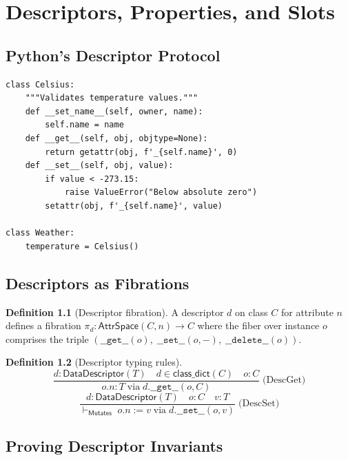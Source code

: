 \documentclass[11pt,a4paper]{report}
\theoremstyle{definition}
\newtheorem{definition}{Definition}[chapter]
\theoremstyle{plain}
\newcommand{\Mutates}{\mathsf{Mutates}}
\begin{document}
\chapter{Descriptors, Properties, and Slots}
\label{ch:descriptors}

\section{Python's Descriptor Protocol}

\begin{lstlisting}[style=python]
class Celsius:
    """Validates temperature values."""
    def __set_name__(self, owner, name):
        self.name = name
    def __get__(self, obj, objtype=None):
        return getattr(obj, f'_{self.name}', 0)
    def __set__(self, obj, value):
        if value < -273.15:
            raise ValueError("Below absolute zero")
        setattr(obj, f'_{self.name}', value)

class Weather:
    temperature = Celsius()
\end{lstlisting}

\section{Descriptors as Fibrations}

\begin{definition}[Descriptor fibration]
A descriptor $d$ on class $C$ for attribute $n$ defines a fibration
$\pi_d : \mathsf{AttrSpace}(C, n) \to C$ where the fiber over instance $o$
comprises the triple
$(\texttt{\_\_get\_\_}(o),\;\texttt{\_\_set\_\_}(o,-),\;\texttt{\_\_delete\_\_}(o))$.
\end{definition}

\begin{definition}[Descriptor typing rules]
\[
  \frac{
    d : \mathsf{DataDescriptor}(T) \quad
    d \in \mathsf{class\_dict}(C) \quad
    o : C
  }{
    o.n : T \;\text{via}\; d.\texttt{\_\_get\_\_}(o, C)
  }
  \;\text{(DescGet)}
\]
\[
  \frac{
    d : \mathsf{DataDescriptor}(T) \quad
    o : C \quad
    v : T
  }{
    \vdash_{\Mutates}\; o.n \mathbin{:=} v
    \;\text{via}\; d.\texttt{\_\_set\_\_}(o, v)
  }
  \;\text{(DescSet)}
\]
\end{definition}

\section{Proving Descriptor Invariants}
\end{document}
